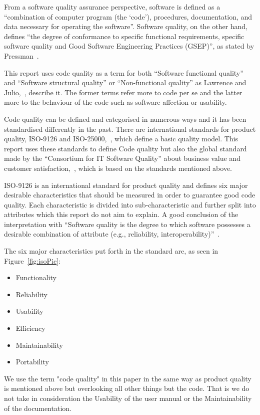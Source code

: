 From a software quality assurance perspective, software is defined  as a ``combination of computer program (the `code'), procedures, documentation, and data necessary for operating the software''\cite{Galin}. Software quality, on the other hand, defines ``the degree of conformance to specific functional requirements, specific software quality and Good Software Engineering Practices (GSEP)'', as stated by Pressman~\cite{Pressman}. 

This report uses code quality as a term for both ``Software functional quality'' and ``Software structural quality'' or ``Non-functional quality'' as Lawrence and Julio,~\cite{Chung}, describe it. The former terms refer more to code per se and the latter more to the behaviour of the code such as software affection or usability. 

Code quality can be defined and categorised in numerous ways and it has been standardised differently in the past. There are international standards for product quality, ISO-9126 and ISO-25000,~\cite{ISO9126}, which define a basic quality model. This report uses these standards to define Code quality but also the global standard made by the ``Consortium for IT Software Quality'' about business value and customer satisfaction,~\cite{cisq}, which is based on the standards mentioned above. 

ISO-9126 is an international standard for product quality and defines six major desirable characteristics that should be measured in order to guarantee good code quality. Each characteristic is divided into sub-characteristic and further split into attributes which this report do not aim to explain. A good conclusion of the interpretation with 
``Software quality is the degree to which software possesses a desirable combination of attribute (e.g., reliability, interoperability)''~\cite{ISO1061}. 

The six major characteristics put forth in the standard are, as seen in Figure~\ref{fig:isoPic}: 
\begin{itemize}
\item Functionality 
\item Reliability
\item Usability
\item Efficiency
\item Maintainability
\item Portability
\end{itemize}

We use the term "code quality" in this paper in the same way as product quality is mentioned above but overlooking all other things but the code. That is we do not take in consideration the Usability of the user manual or the Maintainability of the documentation. 
